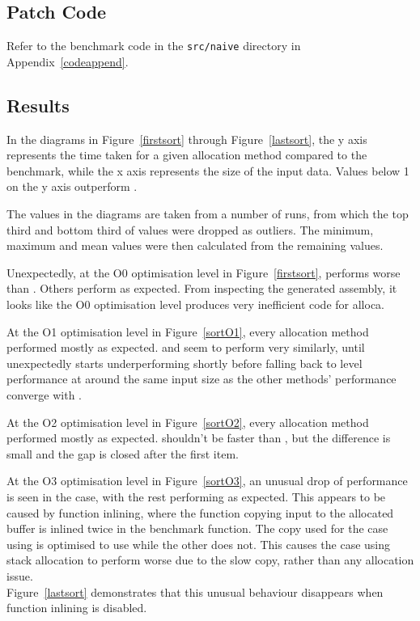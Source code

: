 \subsection{Patch Code}

Refer to the benchmark code in the \texttt{src/naive} directory in Appendix~\ref{codeappend}.

\subsection{Results}

In the diagrams in Figure~\ref{firstsort} through Figure~\ref{lastsort}, the y axis represents the time taken for a given allocation method compared to the  benchmark, while the x axis represents the size of the input data. Values below 1 on the y axis outperform \malloc{}.

The values in the diagrams are taken from a number of runs, from which the top third and bottom third of values were dropped as outliers. The minimum, maximum and mean values were then calculated from the remaining values.

Unexpectedly, at the O0 optimisation level in Figure~\ref{firstsort},  performs worse than . Others perform as expected. From inspecting the generated assembly, it looks like the O0 optimisation level produces very inefficient code for alloca.

At the O1 optimisation level in Figure~\ref{sortO1}, every allocation method performed mostly as expected.  and  seem to perform very similarly, until  unexpectedly starts underperforming  shortly before falling back to  level performance at around the same input size as the other methods' performance converge with .

At the O2 optimisation level in Figure~\ref{sortO2}, every allocation method performed mostly as expected.  shouldn't be faster than , but the difference is small and the gap is closed after the first item.

At the O3 optimisation level in Figure~\ref{sortO3}, an unusual drop of performance is seen in the  case, with the rest performing as expected. This appears to be caused by function inlining, where the function copying input to the allocated buffer is inlined twice in the  benchmark function. The copy used for the case using \malloc{} is optimised to use  while the other does not. This causes the case using stack allocation to perform worse due to the slow copy, rather than any allocation issue.\\
Figure~\ref{lastsort} demonstrates that this unusual behaviour disappears when function inlining is disabled.

